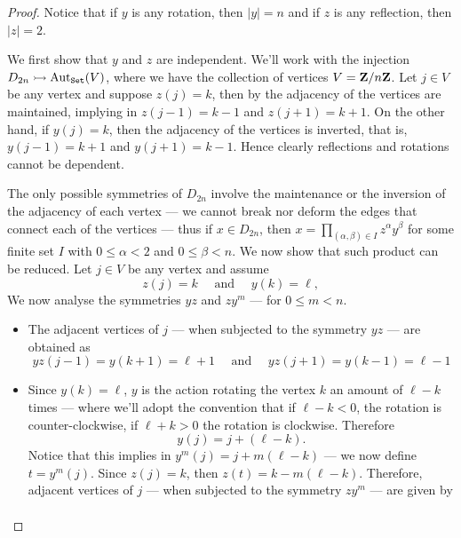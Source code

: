 \begin{proof}
    Notice that if \(y\) is any rotation, then \(|y| = n\) and if \(z\) is any
    reflection, then \(|z| = 2\).

    We first show that \(y\) and \(z\) are independent. We'll work with the
    injection \(D_{2n} \rightarrowtail \operatorname{Aut}_{\texttt{Set}}(V)\), where we have the collection of
    vertices \(V = \mathbf{Z}/n\mathbf{Z}\). Let \(j \in V\) be any vertex and suppose \(z(j) =
    k\), then by the adjacency of the vertices are maintained, implying in \(z(j -
    1) = k - 1\) and \(z(j + 1) = k + 1\). On the other hand, if \(y(j) = k\),
    then the adjacency of the vertices is inverted, that is, \(y(j - 1) = k + 1\)
    and \(y(j + 1) = k - 1\). Hence clearly reflections and rotations cannot be
    dependent.

    The only possible symmetries of \(D_{2n}\) involve the maintenance or the
    inversion of the adjacency of each vertex --- we cannot break nor deform the
    edges that connect each of the vertices --- thus if \(x \in D_{2n}\), then
    \(x = \prod_{(\alpha, \beta) \in I} z^\alpha y^\beta\) for some finite set
    \(I\) with \(0 \leq \alpha < 2\) and \(0 \leq \beta < n\). We now show that such
    product can be reduced. Let \(j \in V\) be any vertex and assume
    \[
        z(j) = k
        \quad\text{ and }\quad
        y(k) = \ell,
    \]
    We now analyse the symmetries \(y z\) and \(z y^m\) --- for \(0 \leq m < n\).
    \begin{itemize}
        \item The adjacent vertices of \(j\) --- when subjected to the symmetry \(y
              z\) --- are obtained as
              \[
                  y z(j - 1) = y(k + 1) = \ell + 1
                  \quad\text{ and }\quad
                  y z(j + 1) = y(k - 1) = \ell - 1
              \]
        \item Since \(y(k) = \ell\), \(y\) is the action rotating the vertex \(k\)
              an amount of \(\ell - k\) times  --- where we'll adopt the convention that
              if \(\ell - k < 0\), the rotation is counter-clockwise, if \(\ell + k >
              0\) the rotation is clockwise. Therefore
              \[
                  y(j) = j + (\ell - k).
              \]
              Notice that this implies in \(y^m(j) = j + m(\ell - k)\) --- we now define
              \(t = y^m(j)\). Since \(z(j) = k\), then \(z(t) = k - m(\ell - k)\).
              Therefore, adjacent vertices of \(j\) --- when subjected to the symmetry
              \(z y^m\) --- are given by
              \begin{gather*}

\end{gather*}
\end{itemize}
\end{proof}

